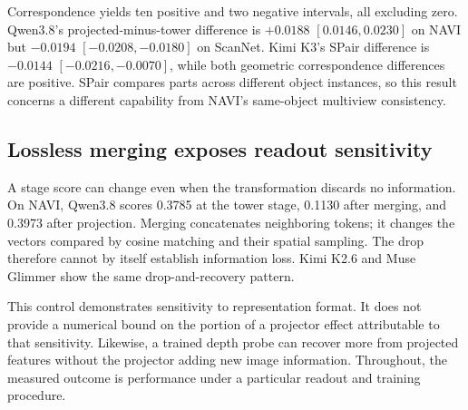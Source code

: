 Correspondence yields ten positive and two negative intervals, all excluding zero.
Qwen3.8's projected-minus-tower difference is $+0.0188$ $[0.0146,0.0230]$ on NAVI but
$-0.0194$ $[-0.0208,-0.0180]$ on ScanNet. Kimi K3's SPair difference is
$-0.0144$ $[-0.0216,-0.0070]$, while both geometric correspondence differences are positive. SPair compares
parts across different object instances, so this result concerns a different capability
from NAVI's same-object multiview consistency.

\subsection{Lossless merging exposes readout sensitivity}
\label{sec:merge}
A stage score can change even when the transformation discards no information.
On NAVI, Qwen3.8 scores 0.3785 at the tower stage, 0.1130 after merging, and 0.3973 after
projection. Merging concatenates neighboring tokens; it changes the vectors compared by
cosine matching and their spatial sampling. The drop therefore cannot by itself establish
information loss. Kimi K2.6 and Muse Glimmer show the same drop-and-recovery pattern.

This control demonstrates sensitivity to representation format. It does not provide a
numerical bound on the portion of a projector effect attributable to that sensitivity.
Likewise, a trained depth probe can recover more from projected features without the
projector adding new image information. Throughout, the measured outcome is performance
under a particular readout and training procedure.
